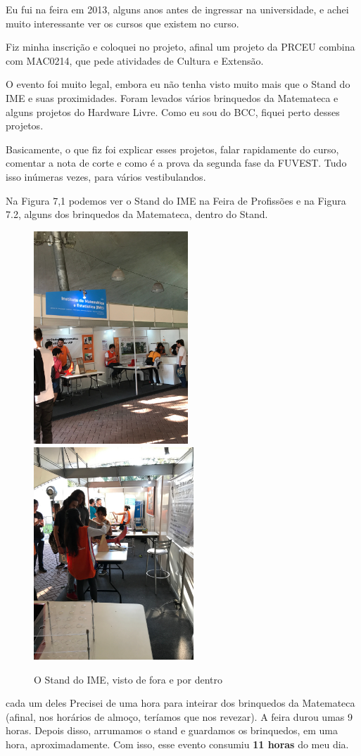 \documentclass[12pt,letterpaper]{article}
\begin{document}
	Eu fui na feira em 2013, alguns anos antes de ingressar na universidade, e achei muito interessante ver os cursos que existem no curso.
	
	Fiz minha inscrição e coloquei no projeto, afinal um projeto da PRCEU combina com MAC0214, que pede atividades de Cultura e Extensão.
	
	O evento foi muito legal, embora eu não tenha visto muito mais que o Stand do IME e suas proximidades. Foram levados vários brinquedos da Matemateca e alguns projetos do Hardware Livre. Como eu sou do BCC, fiquei perto desses projetos.
	
	Basicamente, o que fiz foi explicar esses projetos, falar rapidamente do curso, comentar a nota de corte e como é a prova da segunda fase da FUVEST. Tudo isso inúmeras vezes, para vários vestibulandos. 
	
	Na Figura 7,1 podemos ver o Stand do IME na Feira de Profissões e na Figura 7.2, alguns dos brinquedos da Matemateca, dentro do Stand.
	
	\begin{figure}
		\begin{center}
			\includegraphics[height=8cm]{stand.JPG}
			\includegraphics[height=8cm]{dentro.JPG}  
			\caption{O Stand do IME, visto de fora e por dentro} 
		\end{center}
	\end{figure}
	cada um deles
	Precisei de uma hora para inteirar dos brinquedos da Matemateca (afinal, nos horários de almoço, teríamos que nos revezar). A feira durou umas 9 horas. Depois disso, arrumamos o stand e guardamos os brinquedos, em uma hora, aproximadamente. Com isso, esse evento consumiu \textbf{11 horas} do meu dia.
	
\end{document}
